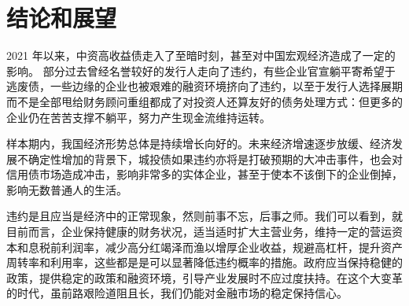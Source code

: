 \chapter{结论和展望}

2021 年以来，中资高收益债走入了至暗时刻，甚至对中国宏观经济造成了一定的影响。
部分过去曾经名誉较好的发行人走向了违约，有些企业官宣躺平寄希望于逃废债，一些边缘的企业也被艰难的融资环境挤向了违约，以至于发行人选择展期而不是全部甩给财务顾问重组都成了对投资人还算友好的债务处理方式：但更多的企业仍在苦苦支撑不躺平，努力产生现金流维持运转。

样本期内，我国经济形势总体是持续增长向好的。未来经济增速逐步放缓、经济发展不确定性增加的背景下，城投债如果违约亦将是打破预期的大冲击事件，也会对信用债市场造成冲击，影响非常多的实体企业，甚至于使本不该倒下的企业倒掉，影响无数普通人的生活。

违约是且应当是经济中的正常现象，然则前事不忘，后事之师。我们可以看到，就目前而言，企业保持健康的财务状况，适当适时扩大主营业务，维持一定的营运资本和息税前利润率，减少高分红竭泽而渔以增厚企业收益，规避高杠杆，提升资产周转率和利用率，这些都是是可以显著降低违约概率的措施。政府应当保持稳健的政策，提供稳定的政策和融资环境，引导产业发展时不应过度扶持。在这个大变革的时代，虽前路艰险道阻且长，我们仍能对金融市场的稳定保持信心。
